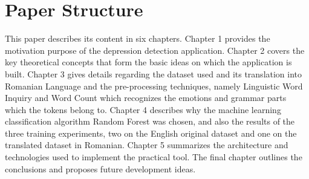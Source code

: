 \section{Paper Structure}

\quad This paper describes its content in six chapters. Chapter 1 provides the motivation  purpose of the depression detection application. Chapter 2 
covers the key theoretical concepts that form the basic ideas on which the application is built. Chapter 3 gives details regarding the dataset used and its translation into Romanian Language and the pre-processing techniques, namely Linguistic Word Inquiry and Word Count which recognizes the emotions and grammar parts which the tokens belong to. Chapter 4 describes why the machine learning classification algorithm Random Forest was chosen, and also the results of the three training experiments, two on the English original dataset and one on the translated dataset in Romanian. 
Chapter 5 summarizes the architecture and technologies used to implement the practical tool. The final chapter outlines the conclusions and proposes future development ideas. 